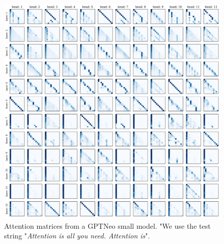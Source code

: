 \begin{figure}
    \centering
    \includegraphics[width=\linewidth]{figures/gpt_neo_attn.png}
    \vspace{2mm}
    \caption{Attention matrices from a GPTNeo small model. "We use the test string "\textit{Attention is all you need. Attention is}".}
    \label{fig:comparisons_1}
\end{figure}
%
